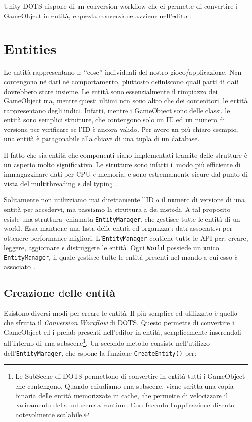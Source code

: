 Unity DOTS dispone di un conversion workflow che ci permette di convertire i GameObject in entità, e questa conversione avviene nell'editor.

\section{Entities}

Le entità rappresentano le ``cose'' individuali del nostro gioco/applicazione. Non contengono né dati né comportamento, piuttosto definiscono quali parti di dati dovrebbero stare insieme. Le entità sono essenzialmente il rimpiazzo dei GameObject ma, mentre questi ultimi non sono altro che dei contenitori, le entità rappresentano degli indici. Infatti, mentre i GameObject sono delle classi, le entità sono semplici strutture, che contengono solo un ID ed un numero di versione per verificare se l'ID è ancora valido. Per avere un più chiaro esempio, una entità è paragonabile alla chiave di una tupla di un database.

Il fatto che sia entità che componenti siano implementati tramite delle strutture è un aspetto molto significativo. Le strutture sono infatti il modo più efficiente di immagazzinare dati per CPU e memoria; e sono estremamente sicure dal punto di vista del multithreading e del typing~\cite{article:ecs-data-structures}.

Solitamente non utilizziamo mai direttamente l'ID o il numero di versione di una entità per accedervi, ma passiamo la struttura a dei metodi. A tal proposito esiste una struttura, chiamata \verb|EntityManager|, che gestisce tutte le entità di un world. Essa mantiene una lista delle entità ed organizza i dati associativi per ottenere performance migliori. L'\verb|EntityManager| contiene tutte le API per: creare, leggere, aggiornare e distruggere le entità. Ogni \verb|World| possiede un unico \verb|EntityManager|, il quale gestisce tutte le entità presenti nel mondo a cui esso è associato~\cite{doc:unity-entities-api}.

\subsection{Creazione delle entità}

Esistono diversi modi per creare le entità. Il più semplice ed utilizzato è quello che sfrutta il \emph{Conversion Workflow} di DOTS. Questo permette di convertire i GameObject ed i prefab presenti nell'editor in entità, semplicemente inserendoli all'interno di una subscene\footnote{Le SubScene di DOTS permettono di convertire in entità tutti i GameObject che contengono. Quando chiudiamo una subscene, viene scritta una copia binaria delle entità memorizzate in cache, che permette di velocizzare il caricamento della subscene a runtime. Così facendo l'applicazione diventa notevolmente scalabile.}. Un secondo metodo consiste nell'utilizzo dell'\verb|EntityManager|, che espone la funzione \verb|CreateEntity()| per:

